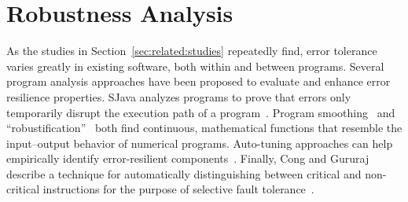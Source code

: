 \section{Robustness Analysis}

As the studies in Section~\ref{sec:related:studies} repeatedly find, error
tolerance varies greatly in existing software, both within and between
programs. Several program analysis approaches have been proposed to evaluate
and enhance error resilience properties. SJava analyzes programs to prove that
errors only temporarily disrupt the execution path of a program~\cite{sjava}.
Program smoothing~\cite{smoothing-cav, smoothing-pldi, smoothing-fse} and
``robustification''~\cite{robustification} both find continuous, mathematical
functions that resemble the input--output behavior of numerical programs.
Auto-tuning approaches can help empirically identify error-resilient
components~\cite{asac}.
Finally, Cong and Gururaj describe a technique for automatically
distinguishing between critical and non-critical instructions for the purpose
of selective fault tolerance~\cite{cong-iccad}.
